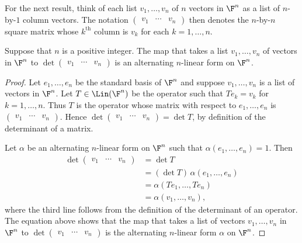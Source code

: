 For the next result, think of each list $v_1,\dots,v_n$ of $n$ vectors in
$\F^n$ as a list of $n$-by-$1$ column vectors. The notation
$\begin{pmatrix} v_1 & \cdots & v_n \end{pmatrix}$ then denotes the
$n$-by-$n$ square matrix whose $k^{\text{th}}$ column is $v_k$ for each
$k=1,\dots,n$.

\begin{result}\label{ax:9.45}
Suppose that $n$ is a positive integer. The map that takes a list
$v_1,\dots,v_n$ of vectors in $\F^n$ to
$\det\begin{pmatrix} v_1 & \cdots & v_n \end{pmatrix}$ is an alternating
$n$-linear form on $\F^n$.
\end{result}

\begin{proof}
Let $e_1,\dots,e_n$ be the standard basis of $\F^n$ and suppose
$v_1,\dots,v_n$ is a list of vectors in $\F^n$. Let $T\in\Lin(\F^n)$ be the
operator such that $Te_k=v_k$ for $k=1,\dots,n$. Thus $T$ is the operator whose
matrix with respect to $e_1,\dots,e_n$ is
$\begin{pmatrix} v_1 & \cdots & v_n \end{pmatrix}$. Hence
$\det\begin{pmatrix} v_1 & \cdots & v_n \end{pmatrix}=\det T$, by definition
of the determinant of a matrix.

Let $\alpha$ be an alternating $n$-linear form on $\F^n$ such that
$\alpha(e_1,\dots,e_n)=1$. Then
\begin{align*}
\det\begin{pmatrix} v_1 & \cdots & v_n \end{pmatrix} &= \det T\\
  &= (\det T)\,\alpha(e_1,\dots,e_n)\\
  &= \alpha(Te_1,\dots,Te_n)\\
  &= \alpha(v_1,\dots,v_n),
\end{align*}
where the third line follows from the definition of the determinant of an
operator. The equation above shows that the map that takes a list of vectors
$v_1,\dots,v_n$ in $\F^n$ to
$\det\begin{pmatrix} v_1 & \cdots & v_n \end{pmatrix}$ is the alternating
$n$-linear form $\alpha$ on $\F^n$.
\end{proof}

